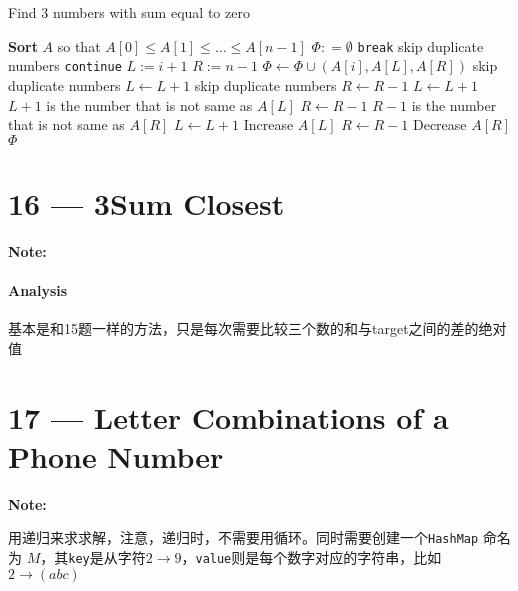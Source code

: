 \documentclass[a4paper,12pt]{article}
\begin{document}
\setcounter{algorithm}{0}
\begin{algorithm}[H]
\caption{Find 3 numbers with sum equal to zero}
\begin{algorithmic}[1]
\Statex
{}
\State \textbf{Sort} $A$ so that $A[0]\leq A[1] \leq \ldots \leq A[n-1]$
\State $\Phi: = \emptyset$
\State \texttt{break}
\EndIf
{} \Comment skip duplicate numbers
\State \texttt{continue}
\EndIf
\State $L:= i+1$
\State $R:=n-1$
\State $\Phi \gets \Phi \cup (A[i], A[L], A[R]) $
 \Comment skip duplicate numbers
\State $L \gets L+1$
\EndWhile
{} \Comment skip duplicate numbers
\State $R \gets R-1$
\EndWhile
\State $L \gets L+1$ \Comment $L+1$ is the number that is not same as $A[L]$
\State $R \gets R-1$ \Comment $R-1$ is the number that is not same as $A[R]$
\State $L \gets L+1$ \Comment Increase $A[L]$
\Else
\State $R \gets R-1$ \Comment Decrease $A[R]$
\EndIf
\EndFor
\State \Return $\Phi$
\EndProcedure
\Statex
\end{algorithmic}
\end{algorithm}

\section{16 --- 3Sum Closest}

\textbf{\large{Note:}}
\paragraph{Analysis}
\begin{CJK*}{UTF8}{gbsn}
基本是和15题一样的方法，只是每次需要比较三个数的和与target之间的差的绝对值
\clearpage
\end{CJK*}

\section{17 --- Letter Combinations of a Phone Number}
\textbf{\large{Note:}}
\begin{CJK*}{UTF8}{gbsn}
用递归来求求解，注意，递归时，不需要用循环。同时需要创建一个\texttt{HashMap} 命名为 $M$，其\texttt{key}是从字符$2\to 9$，\texttt{value}则是每个数字对应的字符串，比如$2 \rightarrow (abc)$
\clearpage
\end{CJK*}
\end{document}
